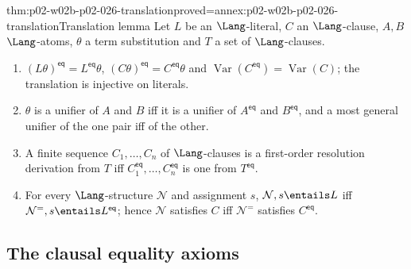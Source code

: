 \begin{hblemma}{thm:p02-w02b-p02-026-translation}{proved=annex:p02-w02b-p02-026-translation}{Translation lemma}
Let \(L\) be an \(\Lang\)-literal, \(C\) an \(\Lang\)-clause, \(A,B\)
\(\Lang\)-atoms, \(\theta\) a term substitution and \(T\) a set of
\(\Lang\)-clauses.
\begin{enumerate}
  \item \((L\theta)^{\mathsf{eq}}=L^{\mathsf{eq}}\theta\),
        \((C\theta)^{\mathsf{eq}}=C^{\mathsf{eq}}\theta\) and
        \(\operatorname{Var}(C^{\mathsf{eq}})=\operatorname{Var}(C)\); the
        translation is injective on literals.
  \item \(\theta\) is a unifier of \(A\) and \(B\) iff it is a unifier of
        \(A^{\mathsf{eq}}\) and \(B^{\mathsf{eq}}\), and a most general
        unifier of the one pair iff of the other.
  \item A finite sequence \(C_1,\ldots,C_n\) of \(\Lang\)-clauses is a
        first-order resolution derivation from \(T\) iff
        \(C_1^{\mathsf{eq}},\ldots,C_n^{\mathsf{eq}}\) is one from
        \(T^{\mathsf{eq}}\).
  \item For every \(\Lang\)-structure \(\mathcal N\) and assignment \(s\),
        \(\mathcal N,s\entails L\) iff
        \(\mathcal N^{=},s\entails L^{\mathsf{eq}}\); hence \(\mathcal N\)
        satisfies \(C\) iff \(\mathcal N^{=}\) satisfies \(C^{\mathsf{eq}}\).
\end{enumerate}
\end{hblemma}

\subsection{The clausal equality axioms}
\label{sec:p02-w02b-p02-026-axioms}

